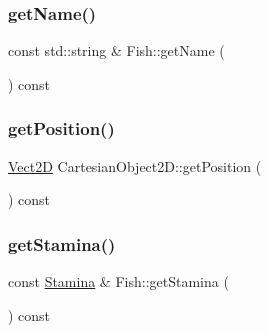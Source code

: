 \mbox{\label{classFish_a96583314997aab0826f1c595f7d58938_a96583314997aab0826f1c595f7d58938}} 
\subsubsection{\texorpdfstring{get\+Name()}{getName()}}
{\footnotesize\ttfamily const std\+::string \& Fish\+::get\+Name (\begin{DoxyParamCaption}{ }\end{DoxyParamCaption}) const\hspace{0.3cm}{\ttfamily [inherited]}}

\mbox{\label{classCartesianObject2D_aa3a6b63777852ab9eb9408ed2536abe2_aa3a6b63777852ab9eb9408ed2536abe2}} 
\subsubsection{\texorpdfstring{get\+Position()}{getPosition()}}
{\footnotesize\ttfamily \hyperlink{classVect2D}{Vect2D} Cartesian\+Object2\+D\+::get\+Position (\begin{DoxyParamCaption}{ }\end{DoxyParamCaption}) const\hspace{0.3cm}{\ttfamily [inherited]}}

\mbox{\label{classFish_a8637a567ecb17376bed45783d5ddb53d_a8637a567ecb17376bed45783d5ddb53d}} 
\subsubsection{\texorpdfstring{get\+Stamina()}{getStamina()}}
{\footnotesize\ttfamily const \hyperlink{classStamina}{Stamina} \& Fish\+::get\+Stamina (\begin{DoxyParamCaption}{ }\end{DoxyParamCaption}) const\hspace{0.3cm}{\ttfamily [inherited]}}

\mbox{\label{classPreda_a0acc2147813c125f3fdd7b0743d62b81_a0acc2147813c125f3fdd7b0743d62b81}} 
